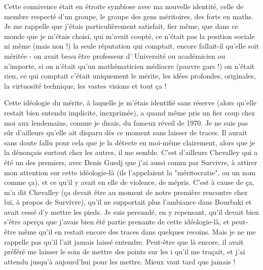 Cette connivence était en étroite symbiose avec ma nouvelle identité, celle de membre respecté d'un groupe, le groupe des gens méritoires, des forts en maths. Je me rappelle que j'étais particulièrement satisfait, fier même, que dans ce monde que je m'étais choisi, qui m'avait coopté, ce n'était pas la position sociale ni même (mais non !) la seule réputation qui comptait, encore fallait-il qu'elle soit méritée - on avait beau être professeur d' Université ou académicien ou n'importe, si on n'était qu'un mathématicien médiocre (pauvre gars !) on n'était rien, ce qui comptait c'était uniquement le mérite, les idées profondes, originales, la virtuosité technique, les vastes visions et tout ça !

Cette idéologie du mérite, à laquelle je m'étais identifié sans réserve (alors qu'elle restait bien entendu implicite, inexprimée), a quand même pris un fier coup chez moi aux lendemains, comme je disais, du fameux réveil de 1970. Je ne suis pas sûr d'ailleurs qu'elle ait disparu dès ce moment sans laisser de traces. Il aurait sans doute fallu pour cela que je la détecte en moi-même clairement, alors que je la dénonçais surtout chez les autres, il me semble. C'est d'ailleurs Chevalley qui a été un des premiers, avec Denis Guedj que j'ai aussi connu par Survivre, à attirer mon attention sur cette idéologie-là (ils l'appelaient la "méritocratie", ou un nom comme ça), et ce qu'il y avait en elle de violence, de mépris. C'est à cause de ça, m'a dit Chevalley (ça devait être au moment de notre première rencontre chez lui, à propos de Survivre), qu'il ne supportait plus l'ambiance dans Bourbaki et avait cessé d'y mettre les pieds. Je suis persuadé, en y repensant, qu'il devait bien s'être aperçu que j'avais bien été partie prenante de cette idéologie-là, et peut-être même qu'il en restait encore des traces dans quelques recoins. Mais je ne me rappelle pas qu'il l'ait jamais laissé entendre. Peut-être que là encore, il avait préféré me laisser le soin de mettre des points sur les i qu'il me traçait, et j'ai attendu jusqu'à aujourd'hui pour les mettre. Mieux vaut tard que jamais !



